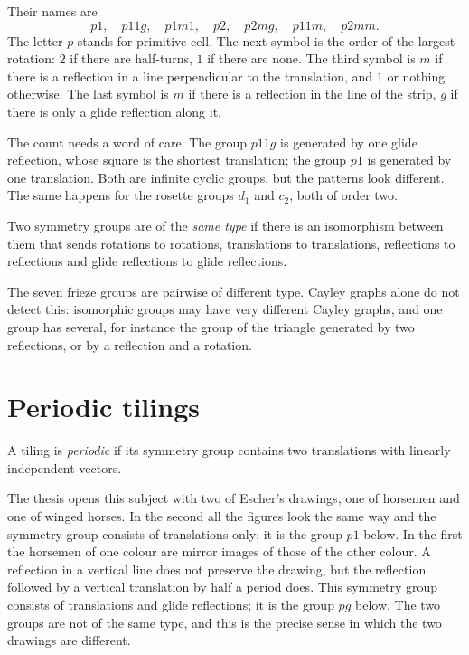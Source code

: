 \noindent
Their names are
$$
p1,\quad p11g,\quad p1m1,\quad p2,\quad
p2mg,\quad p11m,\quad p2mm.
$$
The letter $p$ stands for primitive cell. The
next symbol is the order of the largest
rotation: $2$ if there are half-turns, $1$ if
there are none. The third symbol is $m$ if
there is a reflection in a line perpendicular
to the translation, and $1$ or nothing
otherwise. The last symbol is $m$ if there is
a reflection in the line of the strip, $g$ if
there is only a glide reflection along it.

The count needs a word of care. The group
$p11g$ is generated by one glide reflection,
whose square is the shortest translation; the
group $p1$ is generated by one translation.
Both are infinite cyclic groups, but the
patterns look different. The same happens for
the rosette groups $d_1$ and $c_2$, both of
order two.

\begin{definition}
\label{definition-same-type}
Two symmetry groups are of the \emph{same
type} if there is an isomorphism between them
that sends rotations to rotations,
translations to translations, reflections to
reflections and glide reflections to glide
reflections.
\end{definition}

\noindent
The seven frieze groups are pairwise of
different type. Cayley graphs alone do not
detect this: isomorphic groups may have very
different Cayley graphs, and one group has
several, for instance the group of the
triangle generated by two reflections, or by
a reflection and a rotation.

\section{Periodic tilings}
\label{section-periodic}

\begin{definition}
\label{definition-periodic}
A tiling is \emph{periodic} if its symmetry
group contains two translations with linearly
independent vectors.
\end{definition}

\noindent
The thesis opens this subject with two of
Escher's drawings, one of horsemen and one of
winged horses. In the second all the figures
look the same way and the symmetry group
consists of translations only; it is the
group $p1$ below. In the first the horsemen
of one colour are mirror images of those of
the other colour. A reflection in a vertical
line does not preserve the drawing, but the
reflection followed by a vertical translation
by half a period does. This symmetry group
consists of translations and glide
reflections; it is the group $pg$ below. The
two groups are not of the same type, and this
is the precise sense in which the two drawings
are different.

